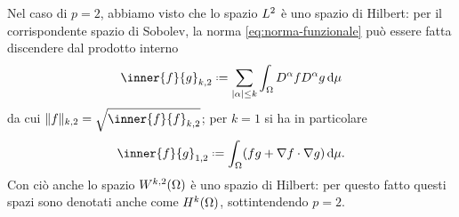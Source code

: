 Nel caso di $p=2$, abbiamo visto che lo spazio $\lclass[2]$ è uno spazio di Hilbert: per il corrispondente spazio di Sobolev, la norma \eqref{eq:norma-funzionale} può essere fatta discendere dal prodotto interno
\begin{equation}
    \inner{f}{g}_{k,2}\defeq
    \sum_{\abs{\alpha}\le k}\int_\Omega D^\alpha fD^\alpha g\,\dd\mu
    \label{eq:prodotto-interno-Wk2}
\end{equation}
da cui $\norm{f}_{k,2}=\sqrt{\inner{f}{f}_{k,2}}$; per $k=1$ si ha in particolare
\begin{equation}
    \inner{f}{g}_{1,2}\defeq
    \int_\Omega (fg+\scalar{\grad f}{\grad g})\,\dd\mu.
    \label{eq:prodotto-interno-W12}
\end{equation}
Con ciò anche lo spazio $\sobW[k,2]{\Omega}$ è uno spazio di Hilbert: per questo fatto questi spazi sono denotati anche come $\sobH[k]{\Omega}$, sottintendendo $p=2$.

